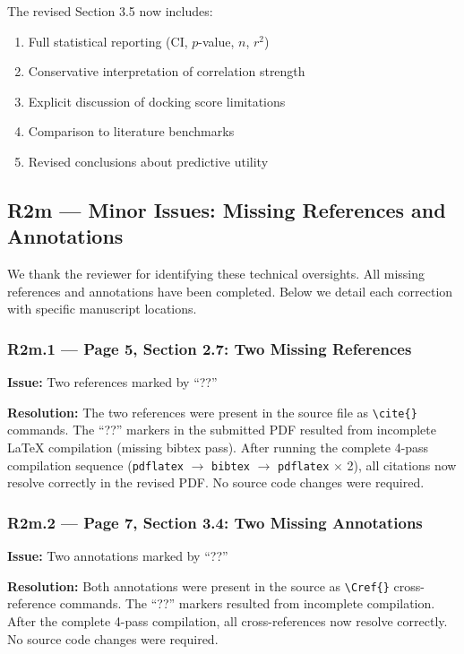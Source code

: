 \documentclass[11pt]{article}
\begin{document}
The revised Section 3.5 now includes:
\begin{enumerate}[leftmargin=1.6em]
\item Full statistical reporting (CI, $p$-value, $n$, $r^2$)
\item Conservative interpretation of correlation strength
\item Explicit discussion of docking score limitations
\item Comparison to literature benchmarks
\item Revised conclusions about predictive utility
\end{enumerate}

\subsection*{R2m --- Minor Issues: Missing References and Annotations}

We thank the reviewer for identifying these technical oversights. All missing references 
and annotations have been completed. Below we detail each correction with specific 
manuscript locations.

\subsubsection*{R2m.1 --- Page 5, Section 2.7: Two Missing References}
\textbf{Issue:} Two references marked by ``??''

\textbf{Resolution:} 
The two references were present in the source file as \texttt{\textbackslash cite\{\}} 
commands. The ``??'' markers in the submitted PDF resulted from incomplete LaTeX compilation 
(missing bibtex pass). After running the complete 4-pass compilation sequence 
(\texttt{pdflatex} $\rightarrow$ \texttt{bibtex} $\rightarrow$ \texttt{pdflatex} $\times$ 2), 
all citations now resolve correctly in the revised PDF. No source code changes were required.

\subsubsection*{R2m.2 --- Page 7, Section 3.4: Two Missing Annotations}
\textbf{Issue:} Two annotations marked by ``??''

\textbf{Resolution:}
Both annotations were present in the source as \texttt{\textbackslash Cref\{\}} cross-reference 
commands. The ``??'' markers resulted from incomplete compilation. After the complete 4-pass 
compilation, all cross-references now resolve correctly. No source code changes were required.
\end{document}
